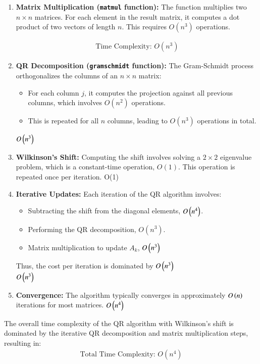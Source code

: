 \documentclass[journal]{IEEEtran}
\begin{document}
\begin{enumerate}
    \item \textbf{Matrix Multiplication (\texttt{matmul} function):} 
    The function multiplies two $n \times n$ matrices. For each element in the result matrix, it computes a dot product of two vectors of length $n$. This requires $O(n^3)$ operations.

    \begin{align}
    \text{Time Complexity: } O(n^3)
    \end{align}

    \item \textbf{QR Decomposition (\texttt{gramschmidt} function):} 
    The Gram-Schmidt process orthogonalizes the columns of an $n \times n$ matrix:
    \begin{itemize}
        \item For each column $j$, it computes the projection against all previous columns, which involves $O(n^2)$ operations.
        \item This is repeated for all $n$ columns, leading to $O(n^3)$ operations in total.
    \end{itemize}
     $O\left(n^3\right)$
    \item \textbf{Wilkinson's Shift:} 
    Computing the shift involves solving a $2 \times 2$ eigenvalue problem, which is a constant-time operation, $O(1)$. This operation is repeated once per iteration.
     O(1)
    \item \textbf{Iterative Updates:} 
    Each iteration of the QR algorithm involves:
    \begin{itemize}
        \item Subtracting the shift from the diagonal elements, $O\left(n^4\right)$.
        \item Performing the QR decomposition, $O(n^3)$.
        \item Matrix multiplication to update $A_k$, $O\left(n^3\right)$
    \end{itemize}
    Thus, the cost per iteration is dominated by $O\left(n^3\right)$\\
     $O\left(n^3\right)$
    \item \textbf{Convergence:} 
    The algorithm typically converges in approximately $O\left(n\right)$ iterations for most matrices.
     $O\left(n^4\right)$

\end{enumerate}
The overall time complexity of the QR algorithm with Wilkinson's shift is dominated by the iterative QR decomposition and matrix multiplication steps, resulting in:
\begin{align}
\text{Total Time Complexity: } O(n^4)
\end{align}
\end{document}

